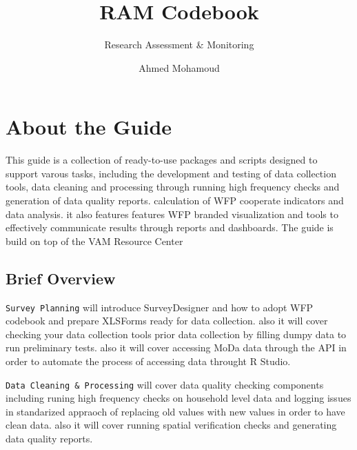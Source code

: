 \documentclass[
  letterpaper,
  DIV=11,
  numbers=noendperiod]{scrreprt}
\title{RAM Codebook}
\subtitle{Research Assessment \& Monitoring}
\author{Ahmed Mohamoud}
\date{}
\renewcommand*\contentsname{Table of contents}
\newcommand\contentsname{Table of contents}
\begin{document}
\maketitle
\ifdefined\Shaded\renewenvironment{Shaded}{\begin{tcolorbox}[interior hidden, boxrule=0pt, enhanced, borderline west={3pt}{0pt}{shadecolor}, frame hidden, sharp corners, breakable]}{\end{tcolorbox}}\fi

\renewcommand*\contentsname{Table of contents}
{
\hypersetup{linkcolor=}
\setcounter{tocdepth}{2}
\tableofcontents
}

\hypertarget{about-the-guide}{%
\chapter*{About the Guide}\label{about-the-guide}}


This guide is a collection of ready-to-use packages and scripts designed
to support varous tasks, including the development and testing of data
collection tools, data cleaning and processing through running high
frequency checks and generation of data quality reports. calculation of
WFP cooperate indicators and data analysis. it also features features
WFP branded visualization and tools to effectively communicate results
through reports and dashboards. The guide is build on top of the VAM
Resource Center

\hypertarget{brief-overview}{%
\section*{Brief Overview}\label{brief-overview}}


\texttt{Survey\ Planning} will introduce SurveyDesigner and how to adopt
WFP codebook and prepare XLSForms ready for data collection. also it
will cover checking your data collection tools prior data collection by
filling dumpy data to run preliminary tests. also it will cover
accessing MoDa data through the API in order to automate the process of
accessing data throught R Studio.

\texttt{Data\ Cleaning\ \&\ Processing} will cover data quality checking
components including runing high frequency checks on household level
data and logging issues in standarized appraoch of replacing old values
with new values in order to have clean data. also it will cover running
spatial verification checks and generating data quality reports.
\end{document}
